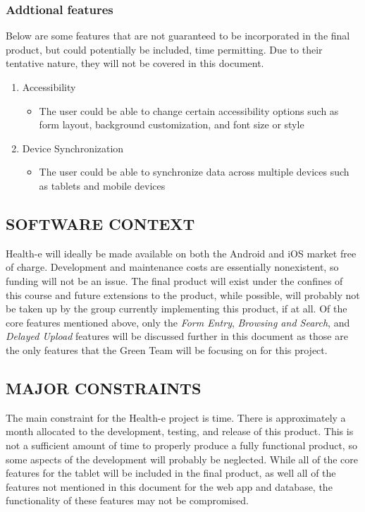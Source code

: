 \documentclass[twoside,letterpaper]{article}
\begin{document}
\subsubsection{Addtional features}
{\rmfamily\color{black}
Below are some features that are not guaranteed to be incorporated in the final product, but could potentially be included, time permitting. Due to their tentative nature, they will not be covered in this document.
\begin{enumerate}
\item Accessibility
\begin{itemize}
\item The user could be able to change certain accessibility options such as form layout, background customization, and font size or style
\end{itemize}
\item Device Synchronization
\begin{itemize}
\item The user could be able to synchronize data across multiple devices such as tablets and mobile devices
\end{itemize}
\end{enumerate}
}

\subsection[SOFTWARE CONTEXT]{\rmfamily\bfseries\color{black}
SOFTWARE CONTEXT}
{\rmfamily\color{black}
Health-e will ideally be made available on both the Android and iOS market free of charge. Development and maintenance costs are essentially nonexistent, so funding will not be an issue. The final product will exist under the confines of this course and future extensions to the product, while possible, will probably not be taken up by the group currently implementing this product, if at all. 
\newline\newline Of the core features mentioned above, only the \textit{Form Entry}, \textit{Browsing and Search}, and \textit{Delayed Upload} features will be discussed further in this document as those are the only features that the Green Team will be focusing on for this project. 
}

\subsection[MAJOR CONSTRAINTS]{\rmfamily\bfseries\color{black}
MAJOR CONSTRAINTS}
{\rmfamily\color{black}
The main constraint for the Health-e project is time. There is approximately a month allocated to the development, testing, and release of this product. This is not a sufficient amount of time to properly produce a fully functional product, so some aspects of the development will probably be neglected. While all of the core features for the tablet will be included in the final product, as well all of the features not mentioned in this document for the web app and database, the functionality of these features may not be compromised. 
}
\end{document}

